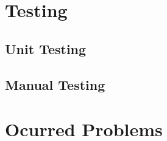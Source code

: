 \documentclass[11pt, a4paper]{article}
\begin{document}
\section{Testing}

\subsection{Unit Testing}

\subsection{Manual Testing}

\section{Ocurred Problems}



\nocite{*}


\end{document}
